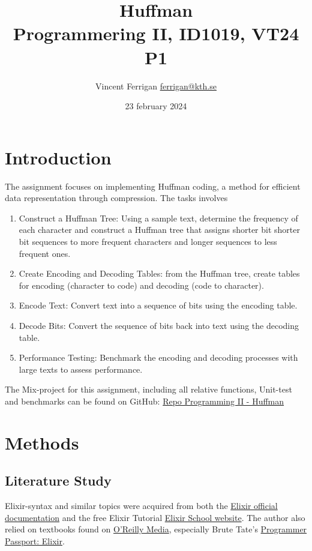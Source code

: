 \documentclass[a4paper,11pt]{article}
\begin{document}
\title{
    Huffman
\\\small{Programmering II, ID1019, VT24 P1}
}
\author{Vincent Ferrigan \href{mailto:ferrigan@kth.se}{ferrigan@kth.se}}

\date{23 february 2024}
\maketitle

\section*{Introduction}
\label{sec:introduction}
The assignment focuses on implementing Huffman coding, a method for
efficient data representation through compression.
The tasks involves
\begin{enumerate}
    \item Construct a Huffman Tree:
    Using a sample text, determine the frequency of each character and construct a Huffman tree that assigns shorter bit shorter bit sequences to more frequent characters and longer sequences to less frequent ones.
    \item Create Encoding and Decoding Tables: 
    from the Huffman tree, create tables for encoding (character to code) and decoding (code to character).
    \item Encode Text:
    Convert text into a sequence of bits using the encoding table.
    \item Decode Bits: 
    Convert the sequence of bits back into text using the decoding table.
    \item Performance Testing: 
    Benchmark the encoding and decoding processes with large texts to assess
    performance.
\end{enumerate}

The Mix-project for this assignment, including all relative functions, Unit-test and benchmarks can be found on GitHub:
\href{https://github.com/VincentFerrigan/kth-id1019-programming-ii/tree/main/tasks/8/huffman}{Repo Programming II - Huffman}%

\section*{Methods}\label{sec:methods}
\subsection*{Literature Study}
\label{subsec:literaturestudy}
Elixir-syntax and similar topics were acquired
from both the
\href{https://elixir-lang.org/docs.html}{Elixir official documentation}
and the free Elixir Tutorial
\href{https://elixirschool.com/en}{Elixir School
website}.
The author also relied on textbooks found on
\href{https://learning.oreilly.com}{O'Reilly Media},
especially Brute Tate's
\href{https://learning.oreilly.com/library/view/programmer-passport-elixir/9781680509649/}{Programmer Passport: Elixir}.
\end{document}
